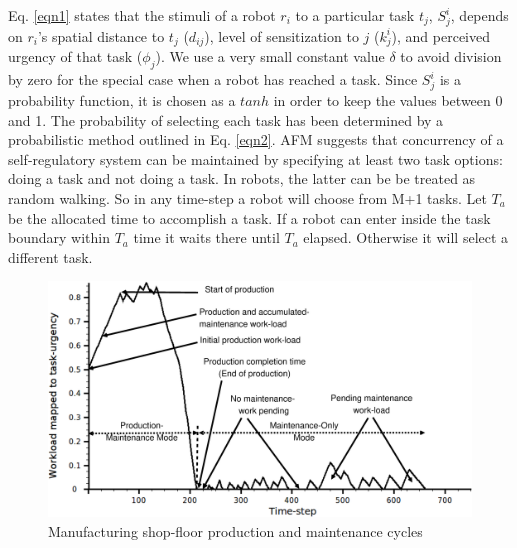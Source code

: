 \documentclass{llncs}
\begin{document}
Eq. \ref{eqn1} states that the stimuli of a robot $r_i$ to a particular task $t_j$, $S_{j}^{i}$, depends on $r_i$'s spatial distance to $t_j$ ($d_{ij}$), level of sensitization to $j$ ($k_{j}^{i}$), and perceived urgency of that task ($\phi _{j}$). We use a very small constant value $\delta$ to avoid division by zero for the special case when a robot has reached a task. Since $S_{j}^{i}$ is a probability function, it is chosen as a $tanh$ in order
to keep the values between 0 and 1. The probability of selecting each task has been determined by a probabilistic method outlined in Eq. \ref{eqn2}.
AFM suggests that concurrency of a self-regulatory system can be maintained by specifying at least two task options: doing a task and not doing a task. In robots, the latter can be be treated as random walking. So in any time-step a robot will choose from M+1 tasks. Let $T_a$ be the allocated time to accomplish a task. If a robot can enter inside the task boundary within $T_a$ time it waits there until $T_a$ elapsed. Otherwise it will select a different task.
\begin{figure}
\centering
\includegraphics[width=12cm, angle=0]
{./images/VSP.eps}
\caption{\small Manufacturing shop-floor production and maintenance cycles}
\label{fig:vsp}  %
\end{figure}
\end{document}
